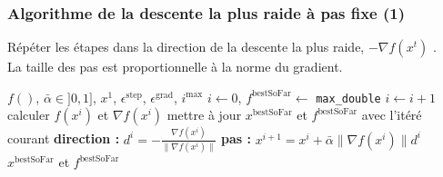 \documentclass[12pt]{beamer}
\begin{document}
\begin{frame}
\begin{itemize}
\begin{frame}
\frametitle{Algorithme de la descente la plus raide à pas fixe (1)} 
Répéter les étapes dans la direction de la descente la plus raide, $-\nabla f(x^t)$ \cite{cauchy1847methode,curry1944method}. \\
La taille des pas est proportionnelle à la norme du gradient.
\begin{block}{}
\begin{algorithmic}
\REQUIRE $f()$, $\bar\alpha \in ]0,1]$, $x^1$, $\epsilon^{\text{step}}$, $\epsilon^{\text{grad}}$, $i^{\text{max}}$
\STATE $i \leftarrow 0$, $f^{\text{bestSoFar}} \leftarrow$ \texttt{max\_double}
\REPEAT 
\STATE $i \leftarrow i+1$
\STATE calculer $f(x^i)$ et $\nabla f(x^i)$
\STATE mettre à jour $x^{\text{bestSoFar}}$ et $f^{\text{bestSoFar}}$ avec l’itéré courant
\ENDIF
\STATE \textbf{direction : } $d^i = - \frac{\nabla f(x^i)}{\lVert \nabla f(x^i) \rVert}$
\STATE \textbf{pas : } $x^{i+1} = x^i + \bar\alpha \lVert \nabla f(x^i) \rVert d^i$
\RETURN $x^{\text{bestSoFar}}$ et $f^{\text{bestSoFar}}$
\end{algorithmic}
\end{block}
\end{frame}





\end{itemize}
\end{frame}
\end{document}
